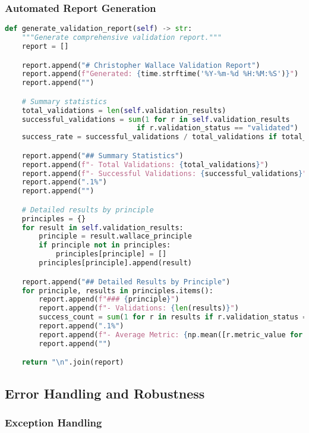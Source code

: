 \subsubsection{Automated Report Generation}

\begin{lstlisting}[language=Python, caption=Validation report generation]
def generate_validation_report(self) -> str:
    """Generate comprehensive validation report."""
    report = []

    report.append("# Christopher Wallace Validation Report")
    report.append(f"Generated: {time.strftime('%Y-%m-%d %H:%M:%S')}")
    report.append("")

    # Summary statistics
    total_validations = len(self.validation_results)
    successful_validations = sum(1 for r in self.validation_results
                               if r.validation_status == "validated")
    success_rate = successful_validations / total_validations if total_validations > 0 else 0

    report.append("## Summary Statistics")
    report.append(f"- Total Validations: {total_validations}")
    report.append(f"- Successful Validations: {successful_validations}")
    report.append(".1%")
    report.append("")

    # Detailed results by principle
    principles = {}
    for result in self.validation_results:
        principle = result.wallace_principle
        if principle not in principles:
            principles[principle] = []
        principles[principle].append(result)

    report.append("## Detailed Results by Principle")
    for principle, results in principles.items():
        report.append(f"### {principle}")
        report.append(f"- Validations: {len(results)}")
        success_count = sum(1 for r in results if r.validation_status == "validated")
        report.append(".1%")
        report.append(f"- Average Metric: {np.mean([r.metric_value for r in results]):.4f}")
        report.append("")

    return "\n".join(report)
\end{lstlisting}

\subsection{Error Handling and Robustness}

\subsubsection{Exception Handling}

